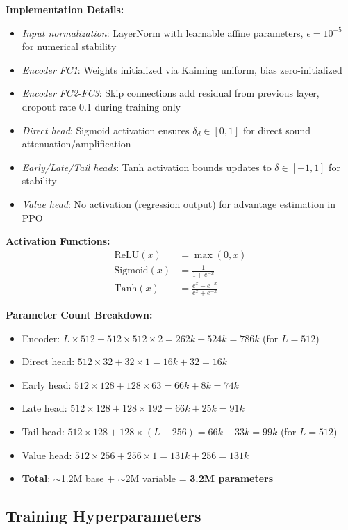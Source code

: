\documentclass[12pt,a4paper]{article}
\begin{document}
\textbf{Implementation Details:}
\begin{itemize}
\item \textit{Input normalization}: LayerNorm with learnable affine parameters, $\epsilon=10^{-5}$ for numerical stability
\item \textit{Encoder FC1}: Weights initialized via Kaiming uniform, bias zero-initialized
\item \textit{Encoder FC2-FC3}: Skip connections add residual from previous layer, dropout rate 0.1 during training only
\item \textit{Direct head}: Sigmoid activation ensures $\delta_d \in [0,1]$ for direct sound attenuation/amplification
\item \textit{Early/Late/Tail heads}: Tanh activation bounds updates to $\delta \in [-1,1]$ for stability
\item \textit{Value head}: No activation (regression output) for advantage estimation in PPO
\end{itemize}

\textbf{Activation Functions:}
\begin{align}
\text{ReLU}(x) &= \max(0, x) \label{eq:relu} \\
\text{Sigmoid}(x) &= \frac{1}{1 + e^{-x}} \label{eq:sigmoid} \\
\text{Tanh}(x) &= \frac{e^x - e^{-x}}{e^x + e^{-x}} \label{eq:tanh}
\end{align}

\textbf{Parameter Count Breakdown:}
\begin{itemize}
\item Encoder: $L \times 512 + 512 \times 512 \times 2 = 262k + 524k = 786k$ (for $L=512$)
\item Direct head: $512 \times 32 + 32 \times 1 = 16k + 32 = 16k$
\item Early head: $512 \times 128 + 128 \times 63 = 66k + 8k = 74k$
\item Late head: $512 \times 128 + 128 \times 192 = 66k + 25k = 91k$
\item Tail head: $512 \times 128 + 128 \times (L-256) = 66k + 33k = 99k$ (for $L=512$)
\item Value head: $512 \times 256 + 256 \times 1 = 131k + 256 = 131k$
\item \textbf{Total}: $\sim$1.2M base + $\sim$2M variable = \textbf{3.2M parameters}
\end{itemize}

\subsection{Training Hyperparameters}
\end{document}
